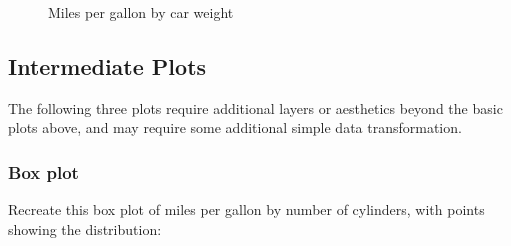 \documentclass[
  man,
  floatsintext,
  longtable,
  nolmodern,
  notxfonts,
  notimes,
  colorlinks=true,linkcolor=blue,citecolor=blue,urlcolor=blue]{apa7}
\begin{document}
\begin{figure}[H]

\caption{\label{fig-plot3-scatterplot}Miles per gallon by car weight}


\end{figure}%

\subsection{Intermediate Plots}\label{intermediate-plots}

The following three plots require additional layers or aesthetics beyond
the basic plots above, and may require some additional simple data
transformation.

\subsubsection{Box plot}\label{box-plot}

Recreate this box plot of miles per gallon by number of cylinders, with
points showing the distribution:
\end{document}
